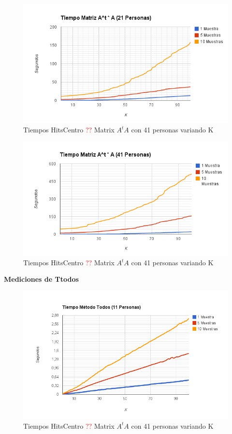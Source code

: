 \begin{figure}[H]
\includegraphics[width=1\textwidth]{img/imagef2.png}
     \caption{Tiempos HitsCentro \textcolor{red}{??} Matrix $A^tA$ con 41 personas variando K}
     \label{fig:figura1}
\end{figure}

\begin{figure}[H]
\includegraphics[width=1\textwidth]{img/imagef3.png}
     \caption{Tiempos HitsCentro \textcolor{red}{??} Matrix $A^tA$ con 41 personas variando K}
     \label{fig:figura1}
\end{figure}



\textbf{Mediciones de Ttodos }

\begin{figure}[H]
\includegraphics[width=1\textwidth]{img/imagef4.png}
     \caption{Tiempos HitsCentro \textcolor{red}{??} Matrix $A^tA$ con 41 personas variando K}
     \label{fig:figura1}
\end{figure}

